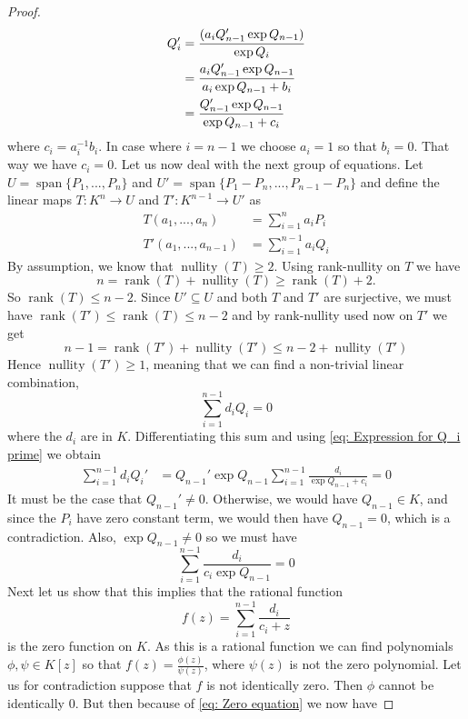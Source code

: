 \documentclass{article}
\DeclareMathOperator{\rank}{rank}
\DeclareMathOperator{\nullity}{nullity}
\newcommand{\Span}{\operatorname{span}}
\begin{document}
\begin{proof}
\begin{align}
        Q_i' &= \frac{(a_i Q_{n-1}' \exp Q_{n-1})}{\exp Q_i} \notag \\
        &= \frac{a_i Q_{n-1}' \exp Q_{n-1}}{a_i \exp Q_{n-1} + b_i} \\
        &= \frac{Q_{n-1}' \exp Q_{n-1}}{\exp Q_{n-1} + c_i} \notag
    \end{align}
    where $c_i = a_i^{-1}b_i$. In case where $i = n-1$ we choose $a_{i} = 1$ so that $b_{i} = 0$. That way we have $c_i = 0$. Let us now deal with the next group of equations. Let $U = \Span \{P_1, ..., P_n \}$ and $U' = \Span \{P_1 - P_n, ..., P_{n-1} - P_n \}$ and define the linear maps $T : K^n \to U$ and $T' : K^{n-1} \to U'$ as
    \begin{align*}
        T(a_1, ..., a_n) &= \sum_{i=1}^n a_i P_i \\
        T'(a_1, ..., a_{n-1}) &= \sum_{i=1}^{n-1} a_i Q_i
    \end{align*}
    By assumption, we know that $\nullity(T) \geq 2$. Using rank-nullity on $T$ we have 
    $$n = \rank(T) + \nullity(T) \geq \rank(T) + 2.$$
    So $\rank(T) \leq n-2$. Since $U' \subseteq U$ and both $T$ and $T'$ are surjective, we must have $\rank(T') \leq \rank(T) \leq n-2$ and by rank-nullity used now on $T'$ we get 
    $$n-1 = \rank(T') + \nullity(T') \leq n-2 + \nullity(T')$$
    Hence $\nullity(T') \geq 1$, meaning that we can find a non-trivial linear combination,
    $$\sum_{i=1}^{n-1} d_i Q_i = 0$$
    where the $d_i$ are in $K$. Differentiating this sum and using \cref{eq: Expression for Q_i prime} we obtain
    \begin{align*}
        \sum_{i=1}^{n-1} d_i Q_i' &= Q_{n-1}' \exp Q_{n-1} \sum_{i=1}^{n-1} \frac{d_i}{\exp Q_{n-1} + c_i} = 0
    \end{align*}
    It must be the case that $Q_{n-1}' \neq 0$. Otherwise, we would have $Q_{n-1} \in K$, and since the $P_i$ have zero constant term, we would then have $Q_{n-1} = 0$, which is a contradiction. Also, $\exp Q_{n-1} \neq 0$ so we must have 
    \begin{equation}\label{eq: Zero equation}
        \sum_{i=1}^{n-1} \frac{d_i}{c_i \exp Q_{n-1}} = 0
    \end{equation}
    Next let us show that this implies that the rational function 
    $$f(z) = \sum_{i=1}^{n-1}\frac{d_i}{c_i + z}$$
    is the zero function on $K$. As this is a rational function we can find polynomials $\phi, \psi \in K[z]$ so that $f(z) = \frac{\phi(z)}{\psi(z)}$, where $\psi(z)$ is not the zero polynomial. Let us for contradiction suppose that $f$ is not identically zero. Then $\phi$ cannot be identically 0. But then because of \cref{eq: Zero equation} we now have

\end{proof}
\end{document}
